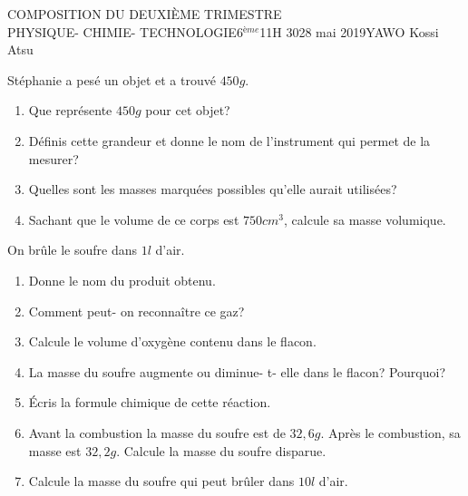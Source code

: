 \documentclass[12pt,a4paper]{book}
\newcommand{\prof}{YAWO Kossi Atsu}
\newcommand{\matiere}{\\PHYSIQUE- CHIMIE- TECHNOLOGIE}
\newcommand{\classe}{6$^{ème}$}
\begin{document}
\begin{devoir}{COMPOSITION DU DEUXIÈME TRIMESTRE}{\matiere}{\classe}{1}{1H 30}{28 mai 2019}{\prof}
\vspace{0.2cm}

\begin{exo}[4]
Stéphanie a pesé un objet et a trouvé $450g$.
\begin{enumerate}
\item Que représente $450g$ pour cet objet?
\item Définis cette grandeur et donne le nom de l'instrument qui permet de la mesurer?
\item Quelles sont les masses marquées possibles qu'elle aurait utilisées?
\item Sachant que le volume de ce corps est $750cm^3$, calcule sa masse volumique.
\end{enumerate}
\end{exo}

\vspace{0.2cm}

\begin{exo}[6]
On brûle le soufre dans $1l$ d'air.
\begin{enumerate}
\item Donne le nom du produit obtenu.
\item Comment peut- on reconnaître ce gaz?
\item Calcule le volume d'oxygène contenu dans le flacon.
\item La masse du soufre augmente ou diminue- t- elle dans le flacon? Pourquoi?
\item Écris la formule chimique de cette réaction.
\item Avant la combustion la masse du soufre est de $32,6g$. Après le combustion, sa masse est $32,2g$. Calcule la masse du soufre disparue.
\item Calcule la masse du soufre qui peut brûler dans $10l$ d'air.
\end{enumerate}
\end{exo}
\end{devoir}
\end{document}
